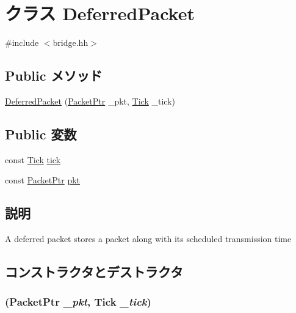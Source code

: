 \hypertarget{classBridge_1_1DeferredPacket}{
\section{クラス DeferredPacket}
\label{classBridge_1_1DeferredPacket}
}


{\ttfamily \#include $<$bridge.hh$>$}\subsection*{Public メソッド}
\begin{DoxyCompactItemize}
\item 
\hyperlink{classBridge_1_1DeferredPacket_a5353c0a3627930082acb1eb2f8549576}{DeferredPacket} (\hyperlink{classPacket}{PacketPtr} \_\-pkt, \hyperlink{base_2types_8hh_a5c8ed81b7d238c9083e1037ba6d61643}{Tick} \_\-tick)
\end{DoxyCompactItemize}
\subsection*{Public 変数}
\begin{DoxyCompactItemize}
\item 
const \hyperlink{base_2types_8hh_a5c8ed81b7d238c9083e1037ba6d61643}{Tick} \hyperlink{classBridge_1_1DeferredPacket_a018b1d349ea79fddf1472935835a1d96}{tick}
\item 
const \hyperlink{classPacket}{PacketPtr} \hyperlink{classBridge_1_1DeferredPacket_a6fb971eb547deb70a1eb9fc09047e9ae}{pkt}
\end{DoxyCompactItemize}


\subsection{説明}
A deferred packet stores a packet along with its scheduled transmission time 

\subsection{コンストラクタとデストラクタ}
\hypertarget{classBridge_1_1DeferredPacket_a5353c0a3627930082acb1eb2f8549576}{
\subsubsection[{DeferredPacket}]{ ({\bf PacketPtr} {\em \_\-pkt}, \/  {\bf Tick} {\em \_\-tick})}}
\label{classBridge_1_1DeferredPacket_a5353c0a3627930082acb1eb2f8549576}



